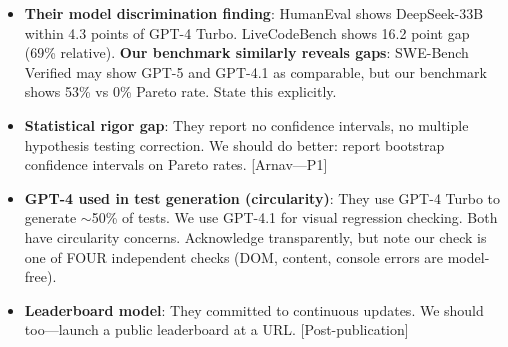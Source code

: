 \begin{itemize}
    \item \textbf{Their model discrimination finding}: HumanEval shows DeepSeek-33B within 4.3 points of GPT-4 Turbo. LiveCodeBench shows 16.2 point gap (69\% relative). \textbf{Our benchmark similarly reveals gaps}: SWE-Bench Verified may show GPT-5 and GPT-4.1 as comparable, but our benchmark shows 53\% vs 0\% Pareto rate. State this explicitly.
    \item \textbf{Statistical rigor gap}: They report no confidence intervals, no multiple hypothesis testing correction. We should do better: report bootstrap confidence intervals on Pareto rates. [Arnav---P1]
    \item \textbf{GPT-4 used in test generation (circularity)}: They use GPT-4 Turbo to generate $\sim$50\% of tests. We use GPT-4.1 for visual regression checking. Both have circularity concerns. Acknowledge transparently, but note our check is one of FOUR independent checks (DOM, content, console errors are model-free).
    \item \textbf{Leaderboard model}: They committed to continuous updates. We should too---launch a public leaderboard at a URL. [Post-publication]
\end{itemize}

